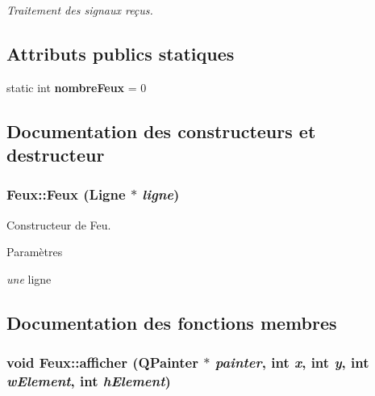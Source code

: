 \begin{DoxyCompactItemize}
\begin{DoxyCompactList}\small\item\em Traitement des signaux reçus. \item\end{DoxyCompactList}\end{DoxyCompactItemize}
\subsection*{Attributs publics statiques}
\begin{DoxyCompactItemize}
\item 
\hypertarget{classFeux_a8116829495e0871822c38ed26f09383f}{
static int {\bfseries nombreFeux} = 0}
\label{classFeux_a8116829495e0871822c38ed26f09383f}

\end{DoxyCompactItemize}


\subsection{Documentation des constructeurs et destructeur}
\hypertarget{classFeux_a875eac84cbac9d6ea9f2505cb59b0701}{
\subsubsection[{Feux}]{\setlength{\rightskip}{0pt plus 5cm}Feux::Feux ({\bf Ligne} $\ast$ {\em ligne})}}
\label{classFeux_a875eac84cbac9d6ea9f2505cb59b0701}


Constructeur de Feu. 


\begin{DoxyParams}{Paramètres}
\item[{\em une}]ligne \end{DoxyParams}


\subsection{Documentation des fonctions membres}
\hypertarget{classFeux_a8bb7f9817c38d79927c9a4b471534889}{
\subsubsection[{afficher}]{\setlength{\rightskip}{0pt plus 5cm}void Feux::afficher (QPainter $\ast$ {\em painter}, \/  int {\em x}, \/  int {\em y}, \/  int {\em wElement}, \/  int {\em hElement})}}
\label{classFeux_a8bb7f9817c38d79927c9a4b471534889}



